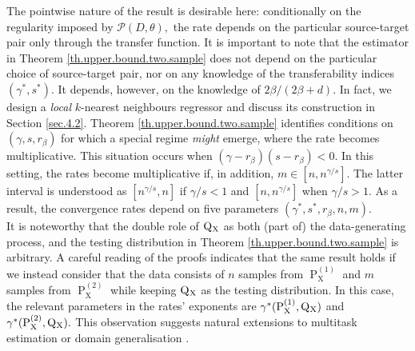 \documentclass[10pt]{article}
\newcommand{\mP}{\mathcal{P}}
\renewcommand{\P}{\operatorname{P}}
\newcommand{\Q}{\operatorname{Q}}
\newcommand{\sX}{\mathrm{X}}
\begin{document}
The pointwise nature of the result is desirable here: conditionally on the regularity imposed by $\mP(D, \theta),$ the rate depends on the particular source-target pair only through the transfer function. It is important to note that the estimator in Theorem \ref{th.upper.bound.two.sample} does not depend on the particular choice of source-target pair, nor on any knowledge of the transferability indices $(\gamma^*, s^*).$ It depends, however, on the knowledge of $2\beta/(2\beta + d).$ In fact, we design a \textit{local} $k$-nearest neighbours regressor and discuss its construction in Section \ref{sec.4.2}. Theorem \ref{th.upper.bound.two.sample} identifies conditions on $(\gamma, s, r_\beta)$ for which a special regime \textit{might} emerge, where the rate becomes multiplicative. This situation occurs when $(\gamma - r_\beta)(s - r_\beta) < 0$. In this setting, the rates become multiplicative if, in addition, $m \in [n, n^{\gamma/s}].$ The latter interval is understood as $[n^{\gamma/s}, n]$ if $\gamma/s < 1$ and $[n, n^{\gamma/s}]$ when $\gamma/s > 1.$ As a result, the convergence rates depend on five parameters $(\gamma^*, s^*, r_\beta, n, m).$\\

It is noteworthy that the double role of $\Q\mathstrut_{\!\sX}$ as both (part of) the data-generating process, and the testing distribution in Theorem \ref{th.upper.bound.two.sample} is arbitrary. A careful reading of the proofs indicates that the same result holds if we instead consider that the data consists of $n$ samples from $\P_{\sX}^{(1)}$ and $m$ samples from $\P_{\sX}^{(2)}$ while keeping $\Q\mathstrut_{\!\sX}$ as the testing distribution. In this case, the relevant parameters in the rates' exponents are $\gamma^*(\P_{\sX}^{(1)}, \Q\mathstrut_{\!\sX})$ and $\gamma^*(\P_{\sX}^{(2)}, \Q\mathstrut_{\!\sX}).$ This observation suggests natural extensions to multitask estimation \cite{blanchard2024estimation} or domain generalisation \cite{blanchard2021domain}. \\
\end{document}
